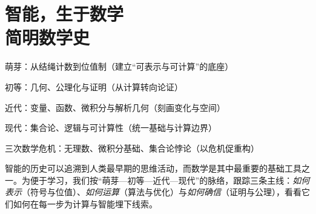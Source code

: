 \chapter{智能，生于数学 \texorpdfstring{\\}{ }简明数学史}

\newenvironment{examplebox}
{\par\vspace{0.5em}\noindent\hrulefill\par\noindent{示例盒子：三跳链}\par\small}
{\par\noindent\hrulefill\vspace{0.5em}\normalsize\par}


\begin{introduction}
\item 萌芽：从结绳计数到位值制（建立“可表示与可计算”的底座）
\item 初等：几何、公理化与证明（从计算转向论证）
\item 近代：变量、函数、微积分与解析几何（刻画变化与空间）
\item 现代：集合论、逻辑与可计算性（统一基础与计算边界）
\item 三次数学危机：无理数、微积分基础、集合论悖论（以危机促重构）
\end{introduction}


智能的历史可以追溯到人类最早期的思维活动，而数学是其中最重要的基础工具之一。为便于学习，我们按“萌芽—初等—近代—现代”的脉络，跟踪三条主线：\emph{如何表示}（符号与位值）、\emph{如何运算}（算法与优化）与\emph{如何确信}（证明与公理），看看它们如何在每一步为计算与智能埋下线索。

